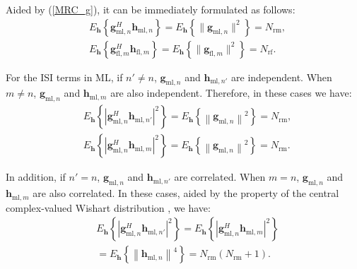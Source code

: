 \documentclass[journal]{IEEEtran}
\begin{document}
Aided by (\ref{MRC_g}), it can be immediately formulated as follows:
\begin{equation}
\begin{split}
&E_{\mathbf{h}}\left\{ \mathbf{g}_{\text{ml},n}^H\mathbf{h}_{\text{ml},n} \right\} = E_{\mathbf{h}}\left\{ \| \mathbf{g}_{\text{ml},n} \|^2 \right\} = N_\text{rm}, \\
&E_{\mathbf{h}}\left\{ \mathbf{g}_{\text{fl},m}^H\mathbf{h}_{\text{fl},m} \right\} = E_{\mathbf{h}}\left\{ \| \mathbf{g}_{\text{fl},m} \|^2 \right\} = N_\text{rf}.
\end{split}
\label{numerator}
\end{equation}

For the ISI terms in ML, if $n'\neq n$, $\mathbf{g}_{\text{ml},n}$ and $\mathbf{h}_{\text{ml},n'}$ are independent. When $m \neq n$, $\mathbf{g}_{\text{ml},n}$ and $\mathbf{h}_{\text{ml},m}$ are also independent. Therefore, in these cases we have:
\begin{equation}
\begin{split}
&E_{\mathbf{h}}\left\{ \left| \mathbf{g}_{\text{ml},n}^H \mathbf{h}_{\text{ml},n'}\right|^2 \right\} = E_{\mathbf{h}}\left\{ \left\| \mathbf{g}_{\text{ml},n} \right\|^2 \right\} = N_\text{rm}, \\
&E_{\mathbf{h}}\left\{ \left| \mathbf{g}_{\text{ml},n}^H \mathbf{h}_{\text{ml},m}\right|^2 \right\} = E_{\mathbf{h}}\left\{ \left\| \mathbf{g}_{\text{ml},n} \right\|^2 \right\} = N_\text{rm}.
\end{split}
\label{idpdt}
\end{equation}

In addition, if $n' = n$, $\mathbf{g}_{\text{ml},n}$ and $\mathbf{h}_{\text{ml},n'}$ are correlated. When $m = n$, $\mathbf{g}_{\text{ml},n}$ and $\mathbf{h}_{\text{ml},m}$ are also correlated. In these cases, aided by the property of the central complex-valued Wishart distribution \cite{Wishart}, we have:
\begin{equation}
\begin{split}
&E_{\mathbf{h}}\left\{ \left| \mathbf{g}_{\text{ml},n}^H \mathbf{h}_{\text{ml},n'}\right|^2 \right\} = E_{\mathbf{h}}\left\{ \left| \mathbf{g}_{\text{ml},n}^H \mathbf{h}_{\text{ml},m}\right|^2 \right\} \\
&= E_{\mathbf{h}}\left\{ \left\| \mathbf{h}_{\text{ml},n} \right\|^4 \right\} = N_\text{rm}(N_\text{rm} + 1).
\end{split}
\label{ucrltd}
\end{equation}
\end{document}
